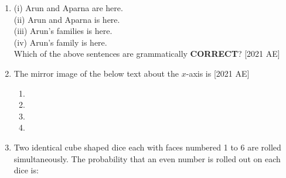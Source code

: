 \documentclass[journal]{IEEEtran}
\begin{document}
\begin{enumerate}
    \item (i) Arun and Aparna are here.\\
    (ii) Arun and Aparna is here. \\
    (iii) Arun's families is here. \\
    (iv) Arun's family is here. \\
    Which of the above sentences are grammatically \textbf{CORRECT}? \hfill[2021 AE]
    \begin{enumerate}
    \end{enumerate}
    \item The mirror image of the below text about the $x$-axis is \hfill[2021 AE]
      
    \begin{enumerate}
        \item 
        \item 
        \item 
        \item 
    \end{enumerate}
    
    \item Two identical cube shaped dice each with faces numbered 1 to 6 are rolled
simultaneously. The probability that an even number is rolled out on each
dice is:


\end{enumerate}
\end{document}
